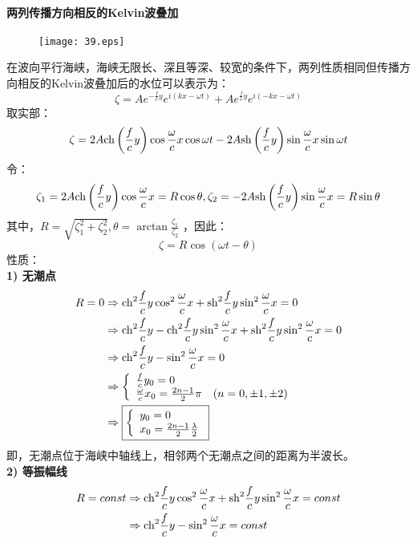 \documentclass[a4paper,12pt]{article}
\begin{document}
	\paragraph{两列传播方向相反的Kelvin波叠加}
	\begin{figure}[H]
		\centering\texttt{[image: 39.eps]}
		\caption*{}
	\end{figure}
	在波向平行海峡，海峡无限长、深且等深、较宽的条件下，两列性质相同但传播方向相反的Kelvin波叠加后的水位可以表示为：
	\[
	\zeta=Ae^{-\frac{f}{c}y}e^{i(kx-\omega t)}+Ae^{\frac{f}{c}y}e^{i(-kx-\omega t)}
	\]
	\indent
	取实部：
	\[
	\zeta=2 A {\rm ch}\left(\frac{f}{c} y\right) \cos \frac{\omega}{c} x\cos\omega t-2 A {\rm sh}\left(\frac{f}{c}y\right) \sin\frac{\omega}{c}x\sin\omega t
	\]
	\indent
	令：
	\[
	\zeta_1=2 A {\rm ch}\left(\frac{f}{c} y\right) \cos \frac{\omega}{c} x=R\cos\theta,
	\zeta_2=-2 A {\rm sh}\left(\frac{f}{c}y\right) \sin\frac{\omega}{c} x=R\sin\theta
	\]
	其中，$R=\sqrt{\zeta_1^2+\zeta_2^2},\theta=\arctan\frac{\zeta_1}{\zeta_2}$
	，因此：
	\[
	\zeta=R\cos(\omega t-\theta)
	\]
	\indent
	性质：\\
	\indent
	\textbf {1) 无潮点}
	\[
	\begin{aligned}
	R=0&\Rightarrow {\rm ch}^{2} \frac{f}{c} y \cos ^{2} \frac{\omega}{c} x+{\rm sh}^{2} \frac{f}{c} y \sin ^{2} \frac{\omega}{c} x=0\\
	&\Rightarrow {\rm ch}^{2} \frac{f}{c} y - {\rm ch}^{2} \frac{f}{c} y\sin ^{2} \frac{\omega}{c} x+{\rm sh}^{2} \frac{f}{c} y \sin ^{2} \frac{\omega}{c} x=0\\
	&\Rightarrow {\rm ch}^{2} \frac{f}{c} y-\sin ^{2} \frac{\omega}{c} x=0\\
	&\Rightarrow\left\{\begin{array}{l}\frac{f}{c} y_{0}=0 \\ \frac{\omega}{c} x_{0}=\frac{2 n-1}{2} \pi \quad(n=0,\pm 1,\pm 2)\end{array}\right.\\
	&\Rightarrow\boxed{\left\{\begin{array}{l}y_{0}=0 \\ x_{0}=\frac{2 n-1}{2}  \frac{\lambda}{2}\end{array}\right.}
	\end{aligned}
	\]
	\indent
	即，无潮点位于海峡中轴线上，相邻两个无潮点之间的距离为半波长。\\
	\indent
	\textbf {2) 等振幅线}
	\[
	\begin{aligned}
	    R=const&\Rightarrow {\rm ch}^{2} \frac{f}{c} y \cos ^{2} \frac{\omega}{c} x+{\rm sh}^{2} \frac{f}{c} y \sin ^{2} \frac{\omega}{c} x=c o n s t\\
	    &\Rightarrow {\rm ch}^{2} \frac{f}{c} y-\sin ^{2} \frac{\omega}{c} x=const
	\end{aligned}
	\]
\end{document}
